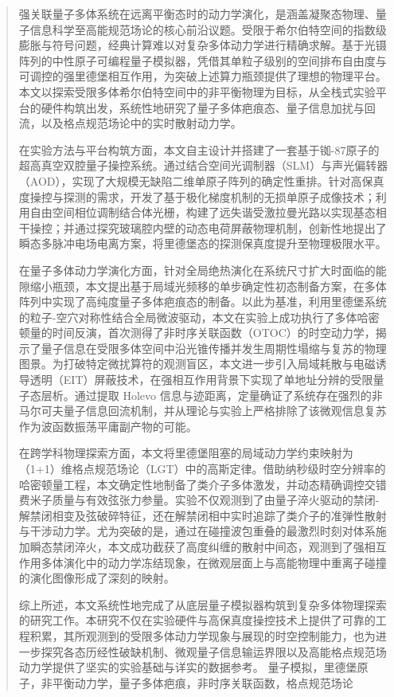 \documentclass[type=doctor, anonymous=true]{hustthesis}
\begin{document}
\maketitle 

\frontmatter

\begin{abstract}
强关联量子多体系统在远离平衡态时的动力学演化，是涵盖凝聚态物理、量子信息科学至高能规范场论的核心前沿议题。受限于希尔伯特空间的指数级膨胀与符号问题，经典计算难以对复杂多体动力学进行精确求解。基于光镊阵列的中性原子可编程量子模拟器，凭借其单粒子级别的空间排布自由度与可调控的强里德堡相互作用，为突破上述算力瓶颈提供了理想的物理平台。本文以探索受限多体希尔伯特空间中的非平衡物理为目标，从全栈式实验平台的硬件构筑出发，系统性地研究了量子多体疤痕态、量子信息加扰与回流，以及格点规范场论中的实时散射动力学。

在实验方法与平台构筑方面，本文自主设计并搭建了一套基于铷-87原子的超高真空双腔量子操控系统。通过结合空间光调制器（SLM）与声光偏转器（AOD），实现了大规模无缺陷二维单原子阵列的确定性重排。针对高保真度操控与探测的需求，开发了基于极化梯度机制的无损单原子成像技术；利用自由空间相位调制结合体光栅，构建了远失谐受激拉曼光路以实现基态相干操控；并通过探究玻璃腔内壁的动态电荷屏蔽物理机制，创新性地提出了瞬态多脉冲电场电离方案，将里德堡态的探测保真度提升至物理极限水平。

在量子多体动力学演化方面，针对全局绝热演化在系统尺寸扩大时面临的能隙缩小瓶颈，本文提出基于局域光频移的单步确定性初态制备方案，在多体阵列中实现了高纯度量子多体疤痕态的制备。以此为基准，利用里德堡系统的粒子-空穴对称性结合全局微波驱动，本文在实验上成功执行了多体哈密顿量的时间反演，首次测得了非时序关联函数（OTOC）的时空动力学，揭示了量子信息在受限多体空间中沿光锥传播并发生周期性塌缩与复苏的物理图景。为打破特定微扰算符的观测盲区，本文进一步引入局域耗散与电磁诱导透明（EIT）屏蔽技术，在强相互作用背景下实现了单地址分辨的受限量子态层析。通过提取 Holevo 信息与迹距离，定量确证了系统存在强烈的非马尔可夫量子信息回流机制，并从理论与实验上严格排除了该微观信息复苏作为波函数振荡平庸副产物的可能。

在跨学科物理探索方面，本文将里德堡阻塞的局域动力学约束映射为（1+1）维格点规范场论（LGT）中的高斯定律。借助纳秒级时空分辨率的哈密顿量工程，本文确定性地制备了类介子多体激发，并动态精确调控交错费米子质量与有效弦张力参量。实验不仅观测到了由量子淬火驱动的禁闭-解禁闭相变及弦破碎特征，还在解禁闭相中实时追踪了类介子的准弹性散射与干涉动力学。尤为突破的是，通过在碰撞波包重叠的最激烈时刻对体系施加瞬态禁闭淬火，本文成功截获了高度纠缠的散射中间态，观测到了强相互作用多体演化中的动力学冻结现象，在微观层面上与高能物理中重离子碰撞的演化图像形成了深刻的映射。

综上所述，本文系统性地完成了从底层量子模拟器构筑到复杂多体物理探索的研究工作。本研究不仅在实验硬件与高保真度操控技术上提供了可靠的工程积累，其所观测到的受限多体动力学现象与展现的时空控制能力，也为进一步探究各态历经性破缺机制、微观量子信息输运界限以及高能格点规范场动力学提供了坚实的实验基础与详实的数据参考。
  \keywords 量子模拟，里德堡原子，非平衡动力学，量子多体疤痕，非时序关联函数，格点规范场论
\end{abstract}
\end{document}
